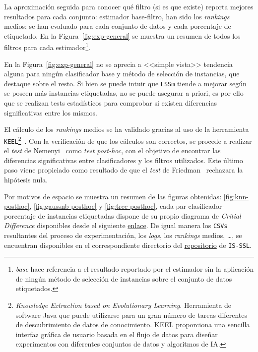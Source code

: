 La aproximación seguida para conocer qué filtro (si es que existe) reporta mejores resultados para cada conjunto: estimador base-filtro, han sido los \textit{rankings} medios; se han evaluado para cada conjunto de datos y cada porcentaje de etiquetado. En la Figura~\ref{fig:exp-general} se muestra un resumen de todos los filtros para cada estimador\footnote{\emph{base} hace referencia a el resultado reportado por el estimador sin la aplicación de ningún método de selección de instancias sobre el conjunto de datos etiquetados.}. 


En la Figura~\ref{fig:exp-general} no se aprecia a <<simple vista>> tendencia alguna para ningún clasificador base y método de selección de instancias, que destaque sobre el resto. Si bien se puede intuir que \texttt{LSSm} tiende a mejorar según se poseen más instancias etiquetadas, no se puede asegurar a priori, es por ello que se realizan tests estadísticos para comprobar si existen diferencias significativas entre los mismos.

El cálculo de los \textit{rankings} medios se ha validado gracias al uso de la herramienta \texttt{KEEL}\footnote{\textit{Knowledge Extraction based on Evolutionary Learning}. Herramienta de software Java que puede utilizarse para un gran número de tareas diferentes de descubrimiento de datos de conocimiento. KEEL proporciona una sencilla interfaz gráfica de usuario basada en el flujo de datos para diseñar experimentos con diferentes conjuntos de datos y algoritmos de IA.}~\cite{alcala2009keel, alcala2011keel}. Con la verificación de que los cálculos son correctos, se procede a realizar el \textit{test} de Nemenyi~\cite{nemenyi1963distribution} como \textit{test} \textit{post-hoc}, con el objetivo de encontrar las diferencias significativas entre clasificadores y los filtros utilizados. Este último paso viene propiciado como resultado de que el \textit{test} de Friedman~\cite{friedman1937use} rechazara la hipótesis nula.

Por motivos de espacio se muestra un resumen de las figuras obtenidas: \ref{fig:knn-posthoc}, \ref{fig:gaussnb-posthoc} y \ref{fig:tree-posthoc},  cada par clasificador-porcentaje de instancias etiquetadas dispone de su propio diagrama de \emph{Critial Difference} disponibles desde el siguiente \href{https://github.com/dpr1005/Semisupervised-learning-and-instance-selection-methods/tree/main/experimentation/result_plots}{enlace}. De igual manera los \texttt{CSVs} resultantes del proceso de experimentación, los \textit{logs}, los \textit{rankings} medios, \dots, se encuentran disponibles en el correspondiente directorio del \href{https://github.com/dpr1005/Semisupervised-learning-and-instance-selection-methods/tree/main/experimentation}{repositorio} de \texttt{IS-SSL}.

